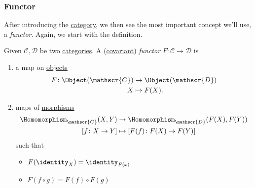 \subsubsection{Functor}
After introducing the \hyperref[def:category]{category}, we then see the most important concept we'll use, a \emph{functor}. Again, we start with the definition.
\begin{definition}[Functor]\label{def:functor}
	Given \(\mathscr{C} , \mathscr{D} \) be two \hyperref[def:category]{categories}. A (\underline{covariant}) \emph{functor} \(F\colon \mathscr{C} \to \mathscr{D}\)
	is
	\begin{enumerate}
		\item a map on \hyperref[def:object]{objects}
		      \[
			      \begin{split}
				      F\colon \Object(\mathscr{C} )&\to \Object(\mathscr{D} )\\
				      X&\mapsto F(X).
			      \end{split}
		      \]
		\item maps of \hyperref[def:morphism]{morphisms}
		      \[
			      \begin{split}
				      \Homomorphism_{\mathscr{C} }(X, Y)&\to \Homomorphism_{\mathscr{D} }(F(X), F(Y))\\
				      \left[f\colon X\to Y\right] &\mapsto \left[F(f)\colon F(X)\to F(Y)\right]
			      \end{split}
		      \]
		      such that
		      \begin{itemize}
			      \item \(F(\identity_{X} ) = \identity_{F(x)} \)
			      \item \(F(f\circ g) = F(f)\circ F(g)\)
		      \end{itemize}
	\end{enumerate}
\end{definition}